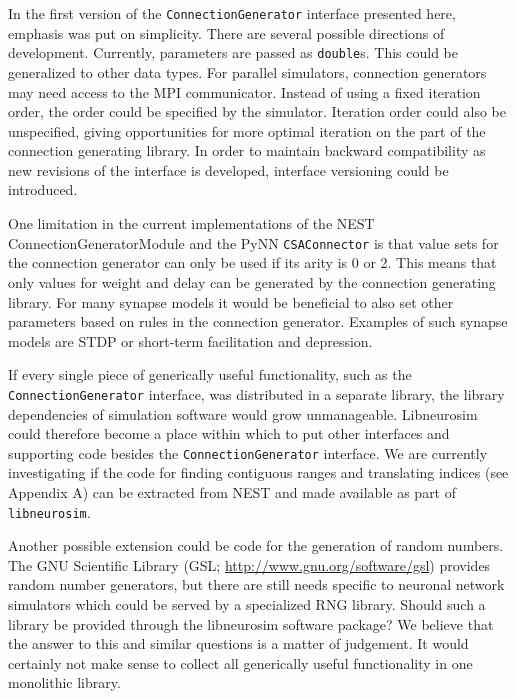 \documentclass{frontiersSCNS} %
\begin{document}
In the first version of the \verb|ConnectionGenerator| interface
presented here, emphasis was put on simplicity. There are several
possible directions of development. Currently, parameters are passed
as \verb|double|s. This could be generalized to other data types.  For
parallel simulators, connection generators may need access to the MPI
communicator.  Instead of using a fixed iteration order, the order
could be specified by the simulator. Iteration order could also be
unspecified, giving opportunities for more optimal iteration on the
part of the connection generating library.  In order to maintain
backward compatibility as new revisions of the interface is developed,
interface versioning could be introduced.

One limitation in the current implementations of the NEST
ConnectionGeneratorModule and the PyNN \verb|CSAConnector| is that
value sets for the connection generator can only be used if its arity
is 0 or 2. This means that only values for weight and delay can be
generated by the connection generating library. For many synapse
models it would be beneficial to also set other parameters based on
rules in the connection generator. Examples of such synapse models are
STDP or short-term facilitation and depression.

If every single piece of generically useful functionality, such as the
\verb|ConnectionGenerator| interface, was distributed in a separate
library, the library dependencies of simulation software would grow
unmanageable.  Libneurosim could therefore become a place within which
to put other interfaces and supporting code besides the
\verb|ConnectionGenerator| interface. We are currently investigating
if the code for finding contiguous ranges and translating indices (see
Appendix A) can be extracted from NEST and made available as part of
\verb|libneurosim|.

Another possible extension could be code for the generation of random
numbers. The GNU Scientific Library (GSL;
\url{http://www.gnu.org/software/gsl}) provides random number
generators, but there are still needs specific to neuronal network
simulators which could be served by a specialized RNG library. Should
such a library be provided through the libneurosim software package?
We believe that the answer to this and similar questions is a matter
of judgement. It would certainly not make sense to collect all
generically useful functionality in one monolithic library.

\end{document}
